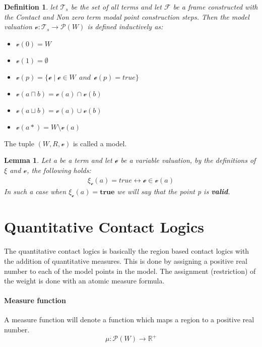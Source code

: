 \documentclass{article}
\newtheorem{defn}{Definition}[section]
\newtheorem{lemma}[theorem]{Lemma}
\newcommand{\curvedE}{\mathscr{e}}
\newcommand{\vE}{\mathscr{v}}
\newcommand{\vBool}{\xi}
\newcommand{\Ts}{\mathcal{T}_s}
\begin{document}
	\begin{defn}
		let $\Ts$ be the set of all terms and let $\mathcal{F}$ be a frame constructed with the Contact and Non zero term modal point construction steps. Then the model valuation $\vE : \Ts \rightarrow \mathscr{P}(W)$ is defined inductively as:
		\begin{itemize}
			\item $\vE(0) = W$
			\item $\vE(1) = \emptyset$
			\item $\vE(p) = \{ \curvedE \; | \; \curvedE \in W \:\:\textit{and}\:\: \curvedE(p) = \textit{true} \}$
			\item $\vE(a \sqcap b) = \vE(a) \cap \vE(b)$
			\item $\vE(a \sqcup b) = \vE(a) \cup \vE(b)$
			\item $\vE(a*) = W \setminus \vE(a)$
		\end{itemize}
	\end{defn}
	\leavevmode\newline
	The tuple $(W, R, \vE)$ is called a model.

	\begin{lemma}
		Let a be a term and let $\curvedE$ be a variable valuation, by the definitions of $\vBool$ and $\vE$, the following holds:
		\begin{align*}
			\vBool_{\curvedE}(a) = true \leftrightarrow \curvedE \in \vE(a)
		\end{align*}
		In such a case when $\vBool_{\curvedE}(a) = \textbf{true}$ we will say that the point p is \textbf{valid}.
	\end{lemma}

	\newpage
	\section{Quantitative Contact Logics}
	The quantitative contact logics is basically the region based contact logics with the addition of quantitative measures. This is done by assigning a 
	positive real number to each of the model points in the model. The assignment (restriction) of the weight is done with an atomic measure formula.

	\paragraph{Measure function} A measure function will denote a function which maps a region to a positive real number.
	\begin{equation*}
		\mu : \mathscr{P}(W) \longrightarrow \mathbb{R}^+
	\end{equation*}
\end{document}
